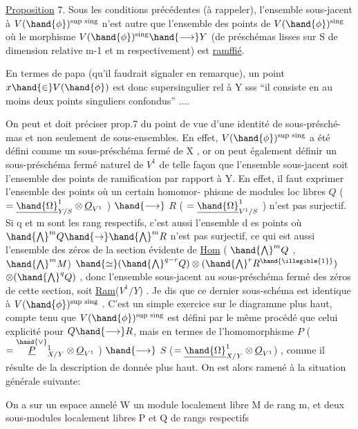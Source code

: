 
\uline{Proposition} 7. Sous les conditions précédentes (à rappeler), l'ensemble
sous-jacent à $V(\hand{\phi})^{\text{sup sing}}$ n'est autre que l'ensemble des points de
$V(\hand{\phi})^{\text{sing}}$  où le morphisme $V(\hand{\phi})^{\text{sing}}\hand{\longrightarrow} Y$ (de préschémas lisses
sur S de dimension relative m-1 et m respectivement) est \uline{ramffié}.

En termes de papa (qu'il faudrait signaler en remarque), un point
$x \hand{\in} V(\hand{\phi})$ est donc supersingulier rel à Y sss ``il consiste en au
moins deux points singuliers confondus'' ....

On peut et doit préciser prop.7 du point de vue d'une identité de  sous-présché-%
mas et non seulement de sous-ensembles. En effet, $V(\hand{\phi})^{\text{sup sing}}$ a été
défini comme un sous-préschéma fermé de X , or on peut également définir
un sous-préschéma fermé naturel de $V^1$ de telle façon que l'ensemble
sous-jacent soit l'ensemble des points de ramification par rapport à Y.
En effet, il faut exprimer l'ensemble des points où un certain homomor-%
phisme de modules loc libres $Q$ ( $=\underline{\hand{\Omega}}^1_{Y/S}\otimes\underline{O}_{V^1}$ ) $\hand{\longrightarrow}$ $R$ ( $=\underline{\hand{\Omega}}^1_{V^1/S}$ )
n'est pas surjectif. Si q et m sont les rang respectifs, c'est aussi
l'ensemble d es points où $\hand{\bigwedge}^{m} Q \hand{\rightarrow} \hand{\bigwedge}^{m} R$ n'est pas surjectif, ce qui est
aussi l'ensemble des zéros de la section évidente de \uline{Hom} ( $\hand{\bigwedge}^{m} Q$ , $\hand{\bigwedge}^{m} M$)
$\hand{\simeq} (\hand{\bigwedge}^{q-r} Q)\otimes(\hand{\bigwedge}^{r} R^{\hand{\illegible{1}}})$$\otimes(\hand{\bigwedge}^{q} Q)$\hand{$^{\vee}$} , donc l'ensemble sous-jacent au sous-préschéma
fermé des zéros de cette section, soit \uline{Ram}($V^1/Y$) . Je dis que ce dernier
sous-schéma est identique à $V(\hand{\phi})^{\text{sup sing}}$ . C'est un simple exercice
sur le diagramme plus haut, compte tenu que $V(\hand{\phi})^{\text{sup sing}}$ est défini
par le même procédé que celui explicité pour $Q\hand{\longrightarrow} R$, mais en termes de
l'homomorphisme $P$ ( $= \overset{\hand{\vee}}{\underline{P}}{}^1_{X/Y}\otimes\underline{O}_{V^1}$ ) $\hand{\longrightarrow}$ $S$ ($=\underline{\hand{\Omega}}^1_{X/Y}\otimes\underline{O}_{V^1}$) , comme
il résulte de la description de \hand{$\mu$} donnée plus haut. On est alors
ramené à la situation générale suivante:

On a sur un  espace annelé W un module localement libre M de rang m,
et deux sous-modules localement libres P et Q de rangs respectifs

